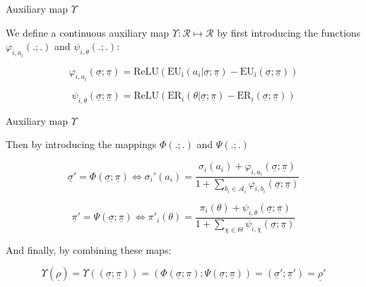 \documentclass{beamer}
\theoremstyle{definition}
\begin{document}
\begin{frame}{Auxiliary map $\Upsilon$}

We define a continuous auxiliary map $\Upsilon : \mathcal{R} \mapsto \mathcal{R}$ by first introducing the functions $\varphi_{i,a_i}(.;.)$ and $\psi_{i,\theta}(.;.)$:

    \begin{equation}
    \label{eq:varphiDef}
        \varphi_{i,a_i}(\underline{\sigma};\underline{\pi}) = 
        \mathrm{ReLU} 
        \left (
        \mathrm{EU_i}(a_i|\underline{\sigma};\underline{\pi})
        -
        \mathrm{EU_i}(\underline{\sigma};\underline{\pi})
        \right )
    \end{equation}

    \begin{equation}
    \label{eq:psiDef}
        \psi_{i,\theta}(\underline{\sigma};\underline{\pi}) = 
        \mathrm{ReLU} 
        \left (
        \mathrm{ER}_i(\theta | \underline{\sigma};\underline{\pi})
        -
        \mathrm{ER}_i(\underline{\sigma};\underline{\pi})
        \right )
    \end{equation}
    
\end{frame}


\begin{frame}{Auxiliary map $\Upsilon$}

Then by introducing the mappings $\Phi(.;.)$ and $\Psi(.;.)$

    \begin{equation}
        \underline{\sigma}' = \Phi(\underline{\sigma};\underline{\pi})
        \iff
        \sigma_i'(a_i) = \frac{\sigma_i(a_i) + \varphi_{i,a_i}(\underline{\sigma};\underline{\pi})}{1 + \sum_{b_i \in \mathcal{A}_i} \varphi_{i,b_i}(\underline{\sigma};\underline{\pi})} 
    \end{equation}

    \begin{equation}
        \underline{\pi}' = \Psi(\underline{\sigma};\underline{\pi})
        \iff
        \pi'_i(\theta) = \frac{\pi_i(\theta) + \psi_{i,\theta}(\underline{\sigma};\underline{\pi})}{1 + \sum_{\chi \in \Theta} \psi_{i,\chi}(\underline{\sigma};\underline{\pi})} 
    \end{equation}

    And finally, by combining these maps:
    
    \begin{equation}
        \Upsilon(\underline{\rho})
        =
        \Upsilon((\underline{\sigma};\underline{\pi}))
        =
        (\Phi(\underline{\sigma};\underline{\pi}); \Psi(\underline{\sigma};\underline{\pi})) 
        =
        (\underline{\sigma}';\underline{\pi}') 
        =
        \underline{\rho}'
    \end{equation}
    
\end{frame}
\end{document}
